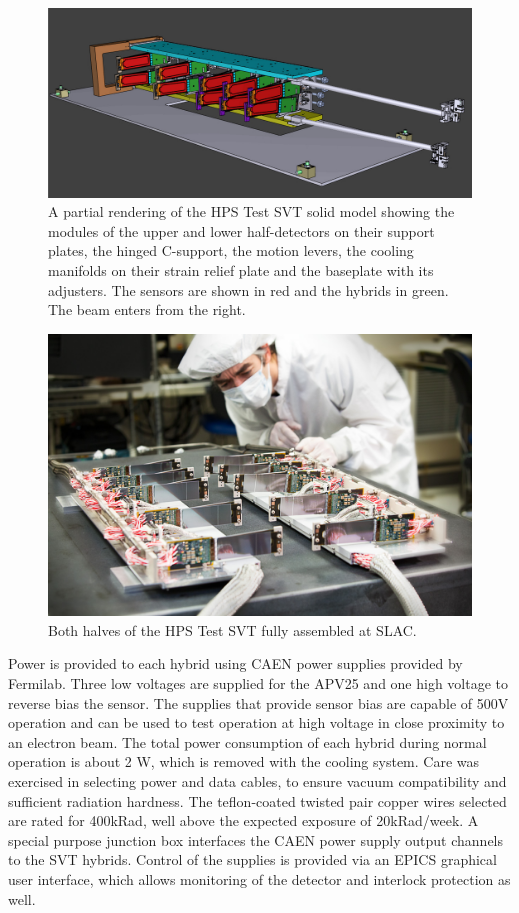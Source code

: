 \begin{figure}[ht]
    \includegraphics[width=\textwidth]{test2012/HPS_nocables_nowires}
\caption{\small{A partial rendering of the HPS Test SVT solid model showing the modules of the upper and lower half-detectors on their support plates, the hinged C-support, the motion levers, the cooling manifolds on their strain relief plate and the baseplate with its adjusters.  The sensors are shown in red and the hybrids in green. The beam enters from the right.} }
\label{fig:tracker_model}
\end{figure}

\begin{figure}[ht]
    \includegraphics[width=\textwidth]{test2012/2012-101-PHOTON-DETECTOR-001.jpg}
\caption{\small{Both halves of the HPS Test SVT fully assembled at SLAC.} }
\label{fig:tracker_halves}
\end{figure}

Power is provided to each hybrid using CAEN power supplies provided by Fermilab. Three low voltages are supplied for the APV25 and one high voltage to reverse bias the sensor. The supplies that provide sensor bias are capable of 500V operation and can be used to test operation at high voltage in close proximity to an electron beam. The total power consumption of each hybrid during normal operation is about 2 W, which is removed with the cooling system. Care was exercised in selecting power and data cables, to ensure vacuum compatibility and sufficient radiation hardness. The teflon-coated twisted pair copper wires selected are rated for 400kRad, well above the expected exposure of 20kRad/week. A special purpose junction box interfaces the CAEN power supply output channels to the SVT hybrids. Control of the supplies is provided via an EPICS graphical user interface, which allows monitoring of the detector and interlock protection as well.

